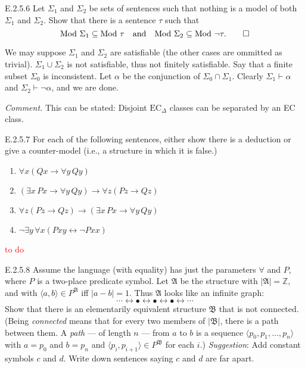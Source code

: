 \begin{exercise}{E.2.5.6}
  Let $\Sigma_1$ and $\Sigma_2$ be sets of sentences such that nothing is a model of both $\Sigma_1$ and $\Sigma_2$. Show that there is a sentence $\tau$ such that
  \[
    \text{Mod } \Sigma_1 \subseteq \text{Mod } \tau \quad \text{and} \quad \text{Mod } \Sigma_2 \subseteq \text{Mod } \lnot \tau.\qedhere
  \]
\end{exercise}

We may suppose $\Sigma_1$ and $\Sigma_2$ are satisfiable (the other cases are ommitted as trivial). $\Sigma_1\cup \Sigma_2$ is not satisfiable, thus not finitely satisfiable. Say that a finite subset $\Sigma_0$ is inconsistent. Let $\alpha$ be the conjunction of $\Sigma_0\cap \Sigma_1$. Clearly $\Sigma_1\vdash \alpha$ and $\Sigma_2\vdash \neg \alpha$, and we are done.

\textit{Comment.} This can be stated: Disjoint $\text{EC}_\Delta$ classes can be separated by an EC class.

\begin{exercise}{E.2.5.7}
  For each of the following sentences, either show there is a deduction or give a counter-model (i.e., a structure in which it is false.)
  \begin{enumerate}[label=(\alph*)]
    \item $\forall x (Qx \rightarrow \forall y \, Qy)$
    \item $(\exists x \, Px \rightarrow \forall y \, Qy) \rightarrow \forall z (Pz \rightarrow Qz)$
    \item $\forall z (Pz \rightarrow Qz) \rightarrow (\exists x \, Px \rightarrow \forall y \, Qy)$
    \item $\neg \exists y \, \forall x (Pxy \leftrightarrow \neg Pxx)$\qedhere
  \end{enumerate}
\end{exercise}

\textcolor{red}{to do}

\begin{exercise}{E.2.5.8}
  Assume the language (with equality) has just the parameters $\forall$ and $P$, where $P$ is a two-place predicate symbol. Let $\mathfrak{A}$ be the structure with $|\mathfrak{A}| = \mathbb{Z}$, and with $\langle a, b \rangle \in P^{\mathfrak{A}}$ iff $|a - b| = 1$. Thus $\mathfrak{A}$ looks like an infinite graph:
  \[
    \cdots \longleftrightarrow \bullet \longleftrightarrow \bullet \longleftrightarrow \bullet \longleftrightarrow \cdots
  \]
  Show that there is an elementarily equivalent structure $\mathfrak{B}$ that is not connected. (Being \emph{connected} means that for every two members of $|\mathfrak{B}|$, there is a path between them. A \emph{path} — of length $n$ — from $a$ to $b$ is a sequence $\langle p_0, p_1, \ldots, p_n \rangle$ with $a = p_0$ and $b = p_n$ and $\langle p_i, p_{i+1} \rangle \in P^{\mathfrak{B}}$ for each $i$.) \textit{Suggestion}: Add constant symbols $c$ and $d$. Write down sentences saying $c$ and $d$ are far apart.
\end{exercise}

